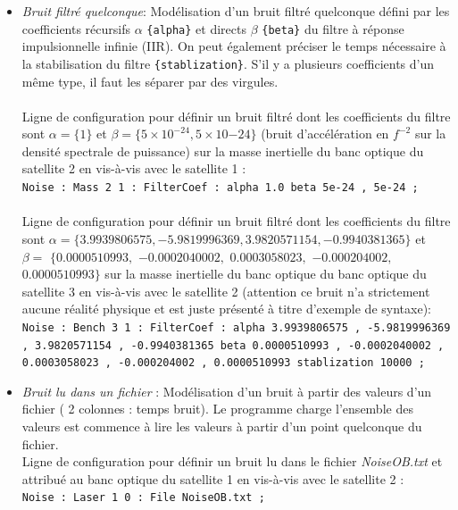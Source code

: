\documentclass[a4paper,english,12pt]{article}
\begin{document}
\begin{itemize}
\item { \it Bruit filtr\'e quelconque}: Mod\'elisation d'un bruit filtr\'e quelconque d\'efini par les coefficients r\'ecursifs $\alpha$ \texttt{\{alpha\}} et directs $\beta$ \texttt{\{beta\}} du filtre \`a r\'eponse impulsionnelle infinie (IIR). On peut \'egalement pr\'eciser le temps n\'ecessaire à la stabilisation du filtre \texttt{\{stablization\}}. S'il y a plusieurs coefficients d’un m\^eme type, il faut les s\'eparer par des virgules.\\ \\
Ligne de configuration pour d\'efinir un bruit filtr\'e dont les coefficients du filtre sont $\alpha = \{1\}$ et $\beta = \{5\times10^{-24} , 5\times10{-24}\}$ (bruit d'acc\'el\'eration en $f^{-2}$ sur la densit\'e spectrale de puissance) sur la masse inertielle du banc optique du satellite 2 en vis-\`a-vis avec le satellite 1 : \\
\hphantom{aaaaa}\texttt{Noise : Mass 2 1 : FilterCoef : alpha 1.0 beta 5e-24 , 5e-24 ;}  \\ \\
Ligne de configuration pour définir un bruit filtr\'e dont les coefficients du filtre sont $\alpha = \{3.9939806575 , -5.9819996369 , 3.9820571154 , -0.9940381365\}$ et $\beta = $ $\{ 0.0000510993 ,$ $ -0.0002040002 , $ $ 0.0003058023 , $ $ -0.000204002 ,$ $ 0.0000510993 \} $ sur la masse inertielle du banc optique du banc optique du satellite 3 en vis-\`a-vis avec le satellite 2 (attention ce bruit n'a strictement aucune r\'ealit\'e physique et est juste pr\'esent\'e \`a titre d'exemple de syntaxe): \\
\hphantom{aaaaa}\texttt{Noise : Bench 3 1 : FilterCoef : alpha 3.9939806575 , -5.9819996369 , 3.9820571154 , -0.9940381365 beta 0.0000510993 , -0.0002040002 , 0.0003058023 , -0.000204002 , 0.0000510993 stablization 10000 ;}  \\

\item { \it Bruit lu dans un fichier }: Mod\'elisation d'un bruit \`a partir des valeurs d'un fichier ( 2 colonnes : temps bruit). Le programme charge l'ensemble des valeurs est commence \`a lire les valeurs à partir d'un point quelconque du fichier.\\
Ligne de configuration pour d\'efinir un bruit lu dans le fichier {\it NoiseOB.txt} et attribu\'e au banc optique du satellite 1 en vis-\`a-vis avec le satellite 2 : \\
\hphantom{aaaaa}\texttt{Noise : Laser 1 0 : File NoiseOB.txt ;}  \\
\end{itemize}
\end{document}
